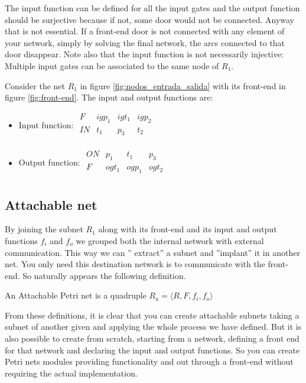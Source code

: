{The input function can be defined for all the input gates and the output function should be surjective because if not, some door would not be connected. Anyway that is not essential. If a front-end door is not connected with any element of your network, simply by solving the final network, the arcs connected to that door disappear. Note also that the input function is not necessarily injective: Multiple input gates can be associated to the same node of $ R_1 $.

\begin{example}
Consider the net $ R_1 $ in figure \ref{fig:nodos_entrada_salida} with its front-end in figure \ref{fig:front-end}. The input and output functions are:

\begin{itemize}
\item Input function: 
$
\begin{array}{c|ccc}
F & igp_1 & igt_1 & igp_2\\
\hline
IN & t_1 & p_3 & t_2\\
\end{array}
$
\item Output function: 
$
\begin{array}{c|ccc}
ON & p_1 & t_1 & p_3\\
\hline
F & ogt_1 & ogp_1 & ogt_2\\
\end{array}
$
\end{itemize}
\end{example}

\subsection{Attachable net}

By joining the subnet $ R_1 $ along with its front-end and its input and output functions $ f_i $ and $ f_o $ we grouped both the internal network with external communication. This way we can '' extract'' a subnet and ''implant'' it in another net. You only need this destination network is to communicate with the front-end. So naturally appears the following definition.

\begin{definition}
An Attachable Petri net is a quadruple $R_a=\langle R,F,f_i,f_o\rangle$
\end{definition}

From these definitions, it is clear that you can create attachable subnets taking a subnet of another given and applying the whole process we have defined. But it is also possible to create from scratch, starting from a network, defining a front end for that network and declaring the input and output functions. So you can create Petri nets modules providing functionality and out through a front-end without requiring the actual implementation.

}
